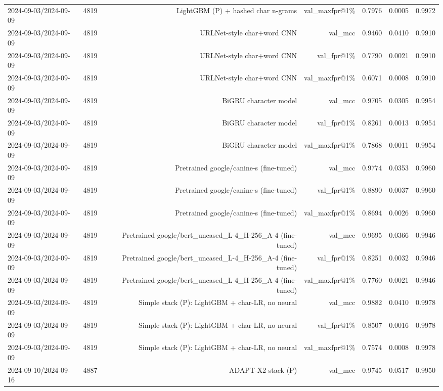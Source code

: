\begin{table}[t]
\begin{tabular}{llrrrrr}
2024-09-03/2024-09-09 & 4819 & LightGBM (P) + hashed char n-grams & val\_maxfpr@1\% & 0.7976 & 0.0005 & 0.9972 \\
2024-09-03/2024-09-09 & 4819 & URLNet-style char+word CNN & val\_mcc & 0.9460 & 0.0410 & 0.9910 \\
2024-09-03/2024-09-09 & 4819 & URLNet-style char+word CNN & val\_fpr@1\% & 0.7790 & 0.0021 & 0.9910 \\
2024-09-03/2024-09-09 & 4819 & URLNet-style char+word CNN & val\_maxfpr@1\% & 0.6071 & 0.0008 & 0.9910 \\
2024-09-03/2024-09-09 & 4819 & BiGRU character model & val\_mcc & 0.9705 & 0.0305 & 0.9954 \\
2024-09-03/2024-09-09 & 4819 & BiGRU character model & val\_fpr@1\% & 0.8261 & 0.0013 & 0.9954 \\
2024-09-03/2024-09-09 & 4819 & BiGRU character model & val\_maxfpr@1\% & 0.7868 & 0.0011 & 0.9954 \\
2024-09-03/2024-09-09 & 4819 & Pretrained google/canine-s (fine-tuned) & val\_mcc & 0.9774 & 0.0353 & 0.9960 \\
2024-09-03/2024-09-09 & 4819 & Pretrained google/canine-s (fine-tuned) & val\_fpr@1\% & 0.8890 & 0.0037 & 0.9960 \\
2024-09-03/2024-09-09 & 4819 & Pretrained google/canine-s (fine-tuned) & val\_maxfpr@1\% & 0.8694 & 0.0026 & 0.9960 \\
2024-09-03/2024-09-09 & 4819 & Pretrained google/bert\_uncased\_L-4\_H-256\_A-4 (fine-tuned) & val\_mcc & 0.9695 & 0.0366 & 0.9946 \\
2024-09-03/2024-09-09 & 4819 & Pretrained google/bert\_uncased\_L-4\_H-256\_A-4 (fine-tuned) & val\_fpr@1\% & 0.8251 & 0.0032 & 0.9946 \\
2024-09-03/2024-09-09 & 4819 & Pretrained google/bert\_uncased\_L-4\_H-256\_A-4 (fine-tuned) & val\_maxfpr@1\% & 0.7760 & 0.0021 & 0.9946 \\
2024-09-03/2024-09-09 & 4819 & Simple stack (P): LightGBM + char-LR, no neural & val\_mcc & 0.9882 & 0.0410 & 0.9978 \\
2024-09-03/2024-09-09 & 4819 & Simple stack (P): LightGBM + char-LR, no neural & val\_fpr@1\% & 0.8507 & 0.0016 & 0.9978 \\
2024-09-03/2024-09-09 & 4819 & Simple stack (P): LightGBM + char-LR, no neural & val\_maxfpr@1\% & 0.7574 & 0.0008 & 0.9978 \\
2024-09-10/2024-09-16 & 4887 & ADAPT-X2 stack (P) & val\_mcc & 0.9745 & 0.0517 & 0.9950 \\

\end{tabular}
\end{table}
